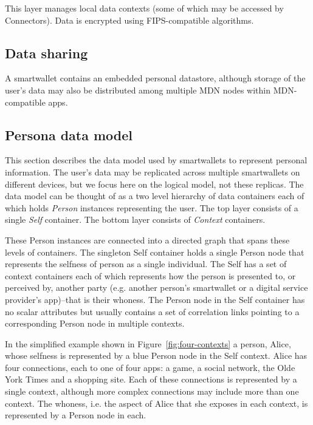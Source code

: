 \documentclass[11pt, oneside]{article}   	%
\begin{document}
This layer manages local data contexts (some of which may be accessed by Connectors). Data is encrypted using FIPS-compatible algorithms. 

\subsection{Data sharing}

A smartwallet contains an embedded personal datastore, although storage of the user's data may also be distributed among multiple MDN nodes within MDN-compatible apps. 

\subsection{Persona data model}\label{data_model_subsection} 

This section describes the data model used by smartwallets to represent personal information. The user's data may be replicated across multiple smartwallets on different devices, but we focus here on the logical model, not these replicas. The data model can be thought of as a two level hierarchy of data containers each of which holds \emph{Person} instances representing the user. The top layer consists of a single \emph{Self} container. The bottom layer consists of \emph{Context} containers.

These Person instances are connected into a directed graph that spans these  levels of containers. The singleton Self container holds a single Person node that represents the selfness of person as a single individual. The Self has a set of context containers each of which represents how the person is presented to, or perceived by, another party (e.g. another person's smartwallet or a digital service provider's app)--that is their whoness. The Person node in the Self container has no scalar attributes but usually contains a set of correlation links pointing to a corresponding Person node in multiple contexts.

In the simplified example shown in Figure~\ref{fig:four-contexts} a person, Alice, whose selfness is represented by a blue Person node in the Self context. Alice has four connections, each to one of four apps: a game, a social network, the Olde York Times and a shopping site. Each of these connections is represented by a single context, although more complex connections may include more than one context. The whoness, i.e. the aspect of Alice that she exposes in each context, is represented by a Person node in each.
\end{document}
